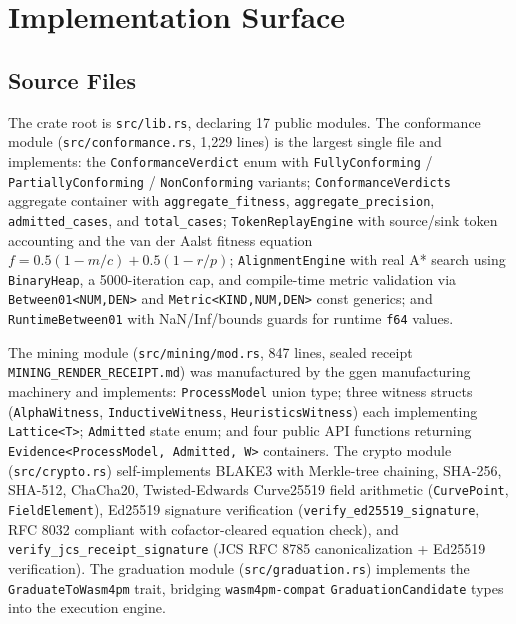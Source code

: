 \section{Implementation Surface}
\label{sec:sources-wasm4pm-implementation}

\subsection{Source Files}
\label{sec:sources-wasm4pm-impl-source-files}

The crate root is \texttt{src/lib.rs}, declaring 17 public modules. The conformance module
(\texttt{src/conformance.rs}, 1,229 lines) is the largest single file and implements: the
\texttt{ConformanceVerdict} enum with \texttt{FullyConforming} / \texttt{PartiallyConforming} /
\texttt{NonConforming} variants; \texttt{ConformanceVerdicts} aggregate container with
\texttt{aggregate\_fitness}, \texttt{aggregate\_precision}, \texttt{admitted\_cases}, and
\texttt{total\_cases}; \texttt{TokenReplayEngine} with source/sink token accounting and the van
der Aalst fitness equation $f = 0.5(1 - m/c) + 0.5(1 - r/p)$; \texttt{AlignmentEngine} with
real A* search using \texttt{BinaryHeap}, a 5000-iteration cap, and compile-time metric
validation via \texttt{Between01<NUM,DEN>} and \texttt{Metric<KIND,NUM,DEN>} const generics; and
\texttt{RuntimeBetween01} with NaN/Inf/bounds guards for runtime \texttt{f64} values.

The mining module (\texttt{src/mining/mod.rs}, 847 lines, sealed receipt
\texttt{MINING\_RENDER\_RECEIPT.md}) was manufactured by the ggen manufacturing machinery and
implements: \texttt{ProcessModel} union type; three witness structs (\texttt{AlphaWitness},
\texttt{InductiveWitness}, \texttt{HeuristicsWitness}) each implementing \texttt{Lattice<T>};
\texttt{Admitted} state enum; and four public API functions returning
\texttt{Evidence<ProcessModel,~Admitted,~W>} containers. The crypto module
(\texttt{src/crypto.rs}) self-implements BLAKE3 with Merkle-tree chaining, SHA-256, SHA-512,
ChaCha20, Twisted-Edwards Curve25519 field arithmetic (\texttt{CurvePoint},
\texttt{FieldElement}), Ed25519 signature verification (\texttt{verify\_ed25519\_signature}, RFC
8032 compliant with cofactor-cleared equation check), and \texttt{verify\_jcs\_receipt\_signature}
(JCS RFC 8785 canonicalization + Ed25519 verification). The graduation module
(\texttt{src/graduation.rs}) implements the \texttt{GraduateToWasm4pm} trait, bridging
\texttt{wasm4pm-compat} \texttt{GraduationCandidate} types into the execution engine.

